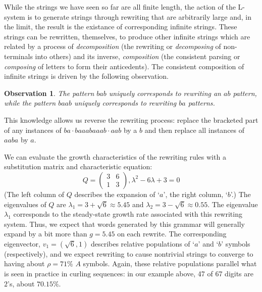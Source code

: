 \documentclass[11pt]{article}
\def\emph#1{{\em #1\/}}
\def\term#1{\emph{#1}}
\newcounter{thm}
\newtheorem{observation}[thm]{Observation}
\def\ni{\noindent}
\def\q#1{`$#1$'}
\begin{document}
While the strings we have seen so far are all finite length, the action of the
L-system is to generate strings through rewriting that are arbitrarily large
and, in the limit, the result is the existance of corresponding infinite
strings.  These strings can be rewritten, themselves, to produce other
infinite strings which are related by a process of \term{decomposition} (the
rewriting or \term{decomposing} of non-terminals into others) and its inverse,
\term{composition} (the consistent parsing or \term{composing} of letters to
form their anticedents).  The consistent composition of infinite strings is driven by the following observation.
\begin{observation}
The pattern $bab$ uniquely corresponds to rewriting an $ab$ pattern,
while the pattern $baab$ uniquely corresponds to rewriting $ba$ patterns.
\end{observation}
\ni This knowledge allows us reverse the rewriting process:
replace the bracketed part of any instances of $ba\cdot baaabaaab\cdot aab$
by a $b$ and then replace all instances of $aaba$ by $a$.

We can evaluate the growth characteristics of the rewriting rules with a
substitution matrix and characteristic equation:
$$Q=\left( \begin{array}{cc} 3 & 6 \\ 1 & 3 \end{array} \right),
\lambda^2-6\lambda +3=0$$ \ni (The left column of $Q$ describes the expansion
of \q{a}, the right column, \q{b}.) The eigenvalues of $Q$ are
$\lambda_1=3+\sqrt{6}\approx 5.45$ and $\lambda_2=3-\sqrt{6}\approx 0.55$.
The eigenvalue $\lambda_1$ corresponds to the steady-state growth rate
associated with this rewriting system.  Thus, we expect that words generated
by this grammar will generally expand by a bit more than $g=5.45$ on each
rewrite.  The corresponding eigenvector, $v_1=(\sqrt{6},1)$ describes relative
populations of \q{a} and \q{b} symbols (respectively), and we expect rewriting to
cause nontrivial strings to converge to having about $\rho=71\%$ $A$ symbols.
Again, these relative populations parallel what is seen in practice in curling
sequences: in our example above, 47 of 67 digits are $2$'s, about $70.15\%$.
\end{document}
